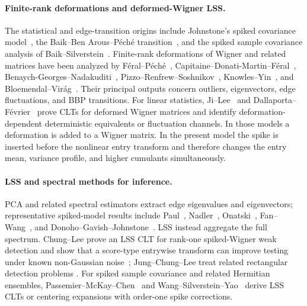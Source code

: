 \documentclass[11pt]{article}
\theoremstyle{definition}
\theoremstyle{remark}
\begin{document}
\paragraph*{Finite-rank deformations and deformed-Wigner LSS.}
The statistical and edge-transition origins include Johnstone's spiked
covariance model~\cite{Johnstone2001}, the Baik--Ben Arous--P\'{e}ch\'{e}
transition~\cite{BaikBenArousPeche2005}, and the spiked sample covariance
analysis of Baik--Silverstein~\cite{BaikSilverstein2006}.  Finite-rank
deformations of Wigner and related matrices have been analyzed by
F\'{e}ral--P\'{e}ch\'{e}~\cite{FeralPeche2007},
Capitaine--Donati-Martin--F\'{e}ral~\cite{CapitaineDonatiMartinFeral2009},
Benaych-Georges--Nadakuditi~\cite{BenaychGeorgesNadakuditi2011},
Pizzo--Renfrew--Soshnikov~\cite{PizzoRenfrewSoshnikov2013},
Knowles--Yin~\cite{KnowlesYin2013}, and
Bloemendal--Vir\'{a}g~\cite{BloemendalVirag2013}.  Their principal outputs
concern outliers, eigenvectors, edge fluctuations, and BBP transitions.
For linear statistics, Ji--Lee~\cite{JiLee2020} and
Dallaporta--F\'{e}vrier~\cite{DallaportaFevrier2025} prove CLTs for deformed
Wigner matrices and identify deformation-dependent deterministic equivalents
or fluctuation channels.  In those models a deformation is added to a Wigner
matrix.  In the present model the spike is inserted before the nonlinear
entry transform and therefore changes the entry mean, variance profile, and
higher cumulants simultaneously.

\paragraph*{LSS and spectral methods for inference.}
PCA and related spectral estimators extract edge eigenvalues and eigenvectors;
representative spiked-model results include
Paul~\cite{Paul2007}, Nadler~\cite{Nadler2008},
Onatski~\cite{Onatski2012}, Fan--Wang~\cite{FanWang2017}, and
Donoho--Gavish--Johnstone~\cite{DonohoGavishJohnstone2018}.  LSS instead
aggregate the full spectrum.  Chung--Lee prove an LSS CLT for rank-one
spiked-Wigner weak detection and show that a score-type entrywise transform
can improve testing under known non-Gaussian noise~\cite{ChungLee2022};
Jung--Chung--Lee treat related rectangular detection problems
\cite{JungChungLee2021}.  For spiked sample covariance and related Hermitian
ensembles, Passemier--McKay--Chen~\cite{PassemierMcKayChen2015} and
Wang--Silverstein--Yao~\cite{WangSilversteinYao2014} derive LSS CLTs or
centering expansions with order-one spike corrections.
\end{document}
